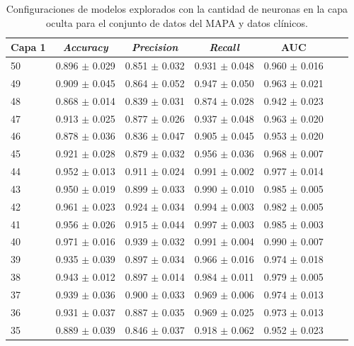\begin{table}[H]
	\centering
	\caption[Configuraciones de modelos explorados para el conjunto de datos del MAPA y datos clínicos.]{Configuraciones de modelos explorados con la cantidad de neuronas en la capa oculta para el conjunto de datos del MAPA y datos clínicos.}
	\begin{tabular}{l c c c c c c}    
		\toprule
		\textbf{Capa 1} & \textbf{\emph{Accuracy}} & \textbf{\emph{Precision}} & \textbf{\emph{Recall}}  & \textbf{AUC}\\
		\midrule
    
      50 & 0.896 $\pm$ 0.029 & 0.851 $\pm$ 0.032	& 0.931 $\pm$ 0.048 & 0.960  $\pm$ 0.016\\
      49 & 0.909 $\pm$ 0.045 & 0.864 $\pm$ 0.052	& 0.947 $\pm$ 0.050 & 0.963  $\pm$ 0.021\\
      48 & 0.868 $\pm$ 0.014 & 0.839 $\pm$ 0.031	& 0.874 $\pm$ 0.028 & 0.942  $\pm$ 0.023\\
      47 & 0.913 $\pm$ 0.025 & 0.877 $\pm$ 0.026	& 0.937 $\pm$ 0.048 & 0.963  $\pm$ 0.020\\
      46 & 0.878 $\pm$ 0.036 & 0.836 $\pm$ 0.047	& 0.905 $\pm$ 0.045 & 0.953  $\pm$ 0.020\\
      45 & 0.921 $\pm$ 0.028 & 0.879 $\pm$ 0.032	& 0.956 $\pm$ 0.036 & 0.968  $\pm$ 0.007\\
      44 & 0.952 $\pm$ 0.013 & 0.911 $\pm$ 0.024	& 0.991 $\pm$ 0.002 & 0.977  $\pm$ 0.014\\      
      43 & 0.950 $\pm$ 0.019 & 0.899 $\pm$ 0.033	& 0.990 $\pm$ 0.010 & 0.985  $\pm$ 0.005\\
      42 & 0.961 $\pm$ 0.023 & 0.924 $\pm$ 0.034	& 0.994 $\pm$ 0.003 & 0.982  $\pm$ 0.005\\
      41 & 0.956 $\pm$ 0.026 & 0.915 $\pm$ 0.044	& 0.997 $\pm$ 0.003 & 0.985  $\pm$ 0.003\\
      40 & 0.971 $\pm$ 0.016 & 0.939 $\pm$ 0.032	& 0.991 $\pm$ 0.004 & 0.990  $\pm$ 0.007\\
      39 & 0.935 $\pm$ 0.039 & 0.897 $\pm$ 0.034	& 0.966 $\pm$ 0.016 & 0.974  $\pm$ 0.018\\
      38 & 0.943 $\pm$ 0.012 & 0.897 $\pm$ 0.014	& 0.984 $\pm$ 0.011 & 0.979  $\pm$ 0.005\\
      37 & 0.939 $\pm$ 0.036 & 0.900 $\pm$ 0.033	& 0.969 $\pm$ 0.006 & 0.974  $\pm$ 0.013\\
      36 & 0.931 $\pm$ 0.037 & 0.887 $\pm$ 0.035	& 0.969 $\pm$ 0.025 & 0.973  $\pm$ 0.013\\
      35 & 0.889 $\pm$ 0.039 & 0.846 $\pm$ 0.037	& 0.918 $\pm$ 0.062 & 0.952  $\pm$ 0.023\\

\end{tabular}
\end{table}
